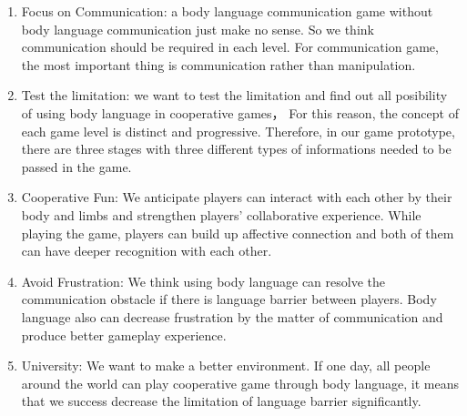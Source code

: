 \documentclass{sigchi}
\begin{document}
\begin{enumerate}
\item Focus on Communication: a body language communication game without body language communication just make no sense. So we think communication should be required in each level. For communication game, the most important thing is communication rather than manipulation.

\item Test the limitation: we want to test the limitation and find out all posibility of using body language in cooperative games，
For this reason, the concept of each game level is distinct and progressive.
Therefore, in our game prototype, there are three stages with three different types of informations needed to be passed in the game. 

\item Cooperative Fun: 
We anticipate players can interact with each other by their body and limbs and strengthen players' collaborative experience. While playing the game, players can build up affective connection and both of them can have deeper recognition with each other.

\item Avoid Frustration: 
We think using body language can resolve the communication obstacle if there is language barrier between players. Body language also can decrease frustration by the matter of communication and produce better gameplay experience.

\item University: We want to make a better environment. If one day, all people around the world can play cooperative game through body language, it means that we success decrease the limitation of language barrier significantly.
\end{enumerate}
\end{document}
